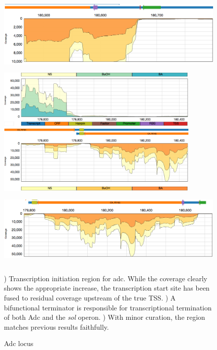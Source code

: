 \begin{figure}
\small
{\includegraphics[width=\textwidth,height=1.5in]{images/Assembly/Examples/Sol/Adc-TSS.png}
\label{fig:5.10a}}
{\includegraphics[width=\textwidth,height=2.5in]{images/Assembly/Examples/Sol/Sol-bifunctional-terminator.png}
\label{fig:5.10b}}
{\includegraphics[width=\textwidth,height=1.5in]{images/Assembly/Examples/Sol/Adc-curated.png}
\label{fig:5.10c}}
\caption{Adc locus}
) Transcription initiation region for adc. While the coverage clearly shows the appropriate increase, the transcription start site has been fused to residual coverage upstream of the true TSS. ) A bifunctional terminator is responsible for transcriptional termination of both Adc and the \textit{sol} operon. ) With minor curation, the region matches previous results faithfully.
\end{figure}


